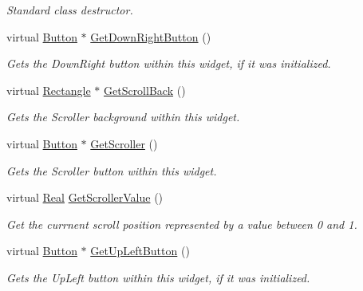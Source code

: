 \begin{DoxyCompactItemize}
\begin{DoxyCompactList}\small\item\em Standard class destructor. \item\end{DoxyCompactList}\item 
virtual \hyperlink{classMezzanine_1_1UI_1_1Button}{Button} $\ast$ \hyperlink{classMezzanine_1_1UI_1_1Scrollbar_a3bd3766aaa1fc8d5fa783b18de2061b7}{GetDownRightButton} ()
\begin{DoxyCompactList}\small\item\em Gets the DownRight button within this widget, if it was initialized. \item\end{DoxyCompactList}\item 
virtual \hyperlink{classMezzanine_1_1UI_1_1Rectangle}{Rectangle} $\ast$ \hyperlink{classMezzanine_1_1UI_1_1Scrollbar_ae5baca9bf557124425ee063cc0d5afc9}{GetScrollBack} ()
\begin{DoxyCompactList}\small\item\em Gets the Scroller background within this widget. \item\end{DoxyCompactList}\item 
virtual \hyperlink{classMezzanine_1_1UI_1_1Button}{Button} $\ast$ \hyperlink{classMezzanine_1_1UI_1_1Scrollbar_a959c0d66d71998f7a7bde333605f034a}{GetScroller} ()
\begin{DoxyCompactList}\small\item\em Gets the Scroller button within this widget. \item\end{DoxyCompactList}\item 
virtual \hyperlink{namespaceMezzanine_a726731b1a7df72bf3583e4a97282c6f6}{Real} \hyperlink{classMezzanine_1_1UI_1_1Scrollbar_a418afe88c4b88759e7c7ddd5ca7cd8ab}{GetScrollerValue} ()
\begin{DoxyCompactList}\small\item\em Get the currnent scroll position represented by a value between 0 and 1. \item\end{DoxyCompactList}\item 
virtual \hyperlink{classMezzanine_1_1UI_1_1Button}{Button} $\ast$ \hyperlink{classMezzanine_1_1UI_1_1Scrollbar_a269c72f430babb108dbce17b0918dc93}{GetUpLeftButton} ()
\begin{DoxyCompactList}\small\item\em Gets the UpLeft button within this widget, if it was initialized. \item\end{DoxyCompactList}\item 

\end{DoxyCompactItemize}
